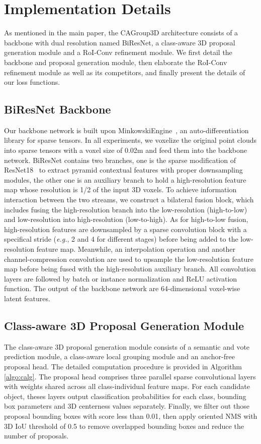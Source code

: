 \documentclass{article}
\begin{document}
\section{Implementation Details}
\label{sec:detail}
As mentioned in the main paper, the CAGroup3D architecture consists of a backbone with dual resolution named BiResNet, a class-aware 3D proposal generation module and a RoI-Conv refinement module. We first detail the backbone and proposal generation module, then elaborate the RoI-Conv refinement module as well as its competitors, and finally present the details of our loss functions.

\subsection{BiResNet Backbone}
Our backbone network is built upon MinkowskiEngine~\cite{choy20194d}, an auto-differentiation library for sparse tensors. In all experiments, we voxelize the original point clouds into sparse tensors with a voxel size of 0.02m and feed them into the backbone network. BiResNet contains two branches, one is the sparse modification of ResNet18~\cite{he2016deep} to extract pyramid contextual features with proper downsampling modules, the other one is an auxiliary branch to hold a high-resolution feature map whose resolution is 1/2 of the input 3D voxels. To achieve information interaction between the two streams, we construct a bilateral fusion block, which includes fusing the high-resolution branch into the low-resolution (high-to-low) and low-resolution into high-resolution (low-to-high). As for high-to-low fusion, high-resolution features are downsampled by a sparse convolution block with a specifical stride (\textit{e.g.}, 2 and 4 for different stages) before being added to the low-resolution feature map. Meanwhile, an interpolation operation and another channel-compression convolution are used to upsample the low-resolution feature map before being fused with the high-resolution auxiliary branch. All convolution layers are followed by batch or instance normalization and ReLU activation function. The output of the backbone network are 64-dimensional voxel-wise latent features.

\subsection{Class-aware 3D Proposal Generation Module}
The class-aware 3D proposal generation module consists of a semantic and vote prediction module, a class-aware local grouping module and an anchor-free proposal head. The detailed computation procedure is provided in Algorithm \ref{algo:calg}. The proposal head comprises three parallel sparse convolutional layers with weights shared across all class-individual feature maps. For each candidate object, theses layers output classification probabilities for each class, bounding box parameters and 3D centerness values separately. Finally, we filter out those proposal bounding boxes with score less than 0.01, then apply oriented NMS with 3D IoU threshold of 0.5 to remove overlapped bounding boxes and reduce the number of proposals.  
\end{document}
